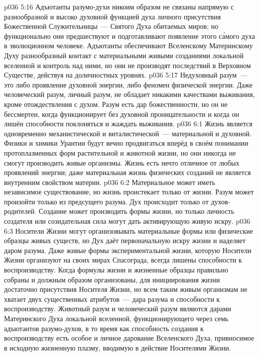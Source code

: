 \vs p036 5:16 Адъютанты разумо\hyp{}духи никоим образом не связаны напрямую с разнообразной и высоко духовной функцией духа личного присутствия Божественной Служительницы~--- Святого Духа обитаемых миров; но функционально они предшествуют и подготавливают появление этого с\'амого духа в эволюционном человеке. Адъютанты обеспечивают Вселенскому Материнскому Духу разнообразный контакт с материальными живыми созданиями локальной вселенной и контроль над ними, но они не производят последствий в Верховном Существе, действуя на доличностных уровнях.
\vs p036 5:17 \pc Недуховный разум~--- это либо проявление духовной энергии, либо феномен физической энергии. Даже человеческий разум, личный разум, не обладает никакими качествами выживания, кроме отождествления с духом. Разум есть дар божественности, но он не бессмертен, когда функционирует без духовной проницательности и когда он лишён способности поклоняться и жаждать выживания.
\vs p036 6:1 Жизнь является одновременно механистической и виталистической~--- материальной и духовной. Физики и химики Урантии будут вечно продвигаться вперёд в своём понимании протоплазменных форм растительной и животной жизни, но они никогда не смогут производить живые организмы. Жизнь есть нечто отличное от любых проявлений энергии; даже материальная жизнь физических созданий не является внутренним свойством материи.
\vs p036 6:2 Материальное может иметь независимое существование, но жизнь проистекает только от жизни. Разум может произойти только из предсущего разума. Дух происходит только от духов\hyp{}родителей. Создание может производить формы жизни, но только личность создателя или созидательная сила могут дать активирующую живую искру.
\vs p036 6:3 Носители Жизни могут организовывать материальные формы или физические образцы живых существ, но Дух даёт первоначальную искру жизни и наделяет даром разума. Даже живые формы экспериментальной жизни, которую Носители Жизни организуют на своих мирах Спасограда, всегда лишены способности к воспроизводству. Когда формулы жизни и жизненные образцы правильно собраны и должным образом организованы, для инициирования жизни достаточно присутствия Носителя Жизни, но всем таким живым организмам не хватает двух существенных атрибутов~--- дара разума и способности к воспроизводству. Животный разум и человеческий разум являются дарами Материнского Духа локальной вселенной, функционирующего через семь адъютантов разумо\hyp{}духов, в то время как способность создания к воспроизводству есть особое и личное дарование Вселенского Духа, привносимое в исходную жизненную плазму, вводимую в действие Носителями Жизни.

